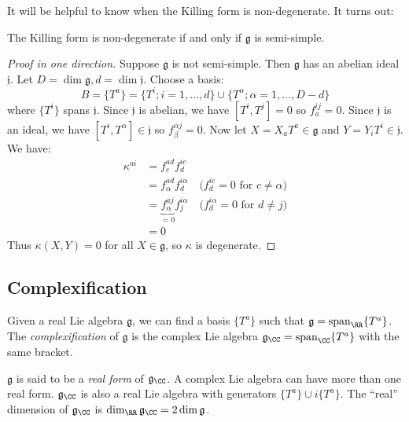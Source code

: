 \documentclass{jknotes}
\begin{document}
It will be helpful to know when the Killing form is non-degenerate. It turns out:
\begin{theorem}[Cartan]
    The Killing form is non-degenerate if and only if \(\mathfrak{g}\) is semi-simple.
\end{theorem}
\begin{proof}[Proof in one direction]
    Suppose \(\mathfrak{g}\) is not semi-simple. Then \(\mathfrak{g}\) has an abelian ideal \(\mathfrak{j}\). Let \(D = \dim \mathfrak{g}, d = \dim \mathfrak{j}\). Choose a basis:
    \begin{equation}
        B = \{T^a\} = \{T^i; i= 1,\dots,d\}\cup\{T^\alpha; \alpha=1,\dots,D-d\}
    \end{equation}
    where \(\{T^i\}\) spans \(\mathfrak{j}\). Since \(\mathfrak{j}\) is abelian, we have \([T^i,T^j] = 0\) so \(f^{ij}_a = 0\). Since \(\mathfrak{j}\) is an ideal, we have \([T^i,T^\alpha] \in \mathfrak{j}\) so \(f^{\alpha j}_\beta = 0\). Now let \(X=X_aT^a \in \mathfrak{g}\) and \(Y = Y_iT^i \in \mathfrak{j}\). We have:
    \begin{align}
        \kappa^{ai} &= f^{ad}_cf^{ic}_d \\
        &= f^{ad}_\alpha f^{i\alpha}_d \quad \text{(\(f^{ic}_d=0\) for \(c\ne\alpha\))} \\
        &= \underbrace{f^{aj}_\alpha}_{=0} f^{i\alpha}_j \quad \text{(\(f^{i\alpha}_d = 0\) for \(d\ne j\))} \\
        &= 0
    \end{align}
    Thus \(\kappa(X,Y) = 0\) for all \(X \in \mathfrak{g}\), so \(\kappa\) is degenerate.
\end{proof}

\subsection{Complexification}

\begin{defn}
    Given a real Lie algebra \(\mathfrak{g}\), we can find a basis \(\{T^a\}\) such that \(\mathfrak{g}=\operatorname{span}_\RR\{T^a\}\). The \emph{complexification} of \(\mathfrak{g}\) is the complex Lie algebra \(\mathfrak{g}_\CC=\operatorname{span}_\CC\{T^a\}\) with the same bracket. 
\end{defn}

\(\mathfrak{g}\) is said to be a \emph{real form} of \(\mathfrak{g}_\CC\). A complex Lie algebra can have more than one real form. \(\mathfrak{g}_\CC\) is also a real Lie algebra with generators \(\{T^a\}\cup i\{T^a\}\). The ``real'' dimension of \(\mathfrak{g}_\CC\) is \(\dim_\RR\mathfrak{g}_\CC=2\dim\mathfrak{g}\).
\end{document}
